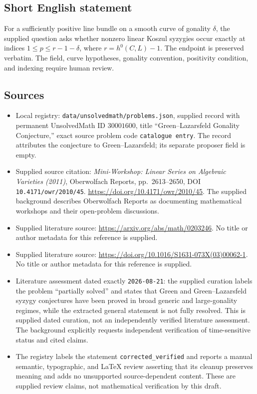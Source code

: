 \documentclass[11pt]{article}
\begin{document}
\subsection{Short English statement}
For a sufficiently positive line bundle on a smooth curve of gonality \(\delta\), the supplied question asks whether nonzero linear Koszul syzygies occur exactly at indices \(1\leq p\leq r-1-\delta\), where \(r=h^0(C,L)-1\). The endpoint is preserved verbatim. The field, curve hypotheses, gonality convention, positivity condition, and indexing require human review.
\subsection{Sources}
\begin{itemize}
\item Local registry: \texttt{data/unsolvedmath/problems.json}, supplied record with permanent UnsolvedMath ID \(30001600\), title ``Green--Lazarsfeld Gonality Conjecture,'' exact source problem code \texttt{catalogue entry}. The record attributes the conjecture to Green--Lazarsfeld; its separate proposer field is empty.
\item Supplied source citation: \emph{Mini-Workshop: Linear Series on Algebraic Varieties (2011)}, Oberwolfach Reports, pp.~2613--2650, DOI \texttt{10.4171/owr/2010/45}. \url{https://doi.org/10.4171/owr/2010/45}. The supplied background describes Oberwolfach Reports as documenting mathematical workshops and their open-problem discussions.
\item Supplied literature source: \url{https://arxiv.org/abs/math/0203246}. No title or author metadata for this reference is supplied.
\item Supplied literature source: \url{https://doi.org/10.1016/S1631-073X(03)00062-1}. No title or author metadata for this reference is supplied.
\item Literature assessment dated exactly \texttt{2026-08-21}: the supplied curation labels the problem ``partially solved'' and states that Green and Green--Lazarsfeld syzygy conjectures have been proved in broad generic and large-gonality regimes, while the extracted general statement is not fully resolved. This is supplied dated curation, not an independently verified literature assessment. The background explicitly requests independent verification of time-sensitive status and cited claims.
\item The registry labels the statement \texttt{corrected\_verified} and reports a manual semantic, typographic, and LaTeX review asserting that its cleanup preserves meaning and adds no unsupported source-dependent content. These are supplied review claims, not mathematical verification by this draft.
\end{itemize}
\end{document}
